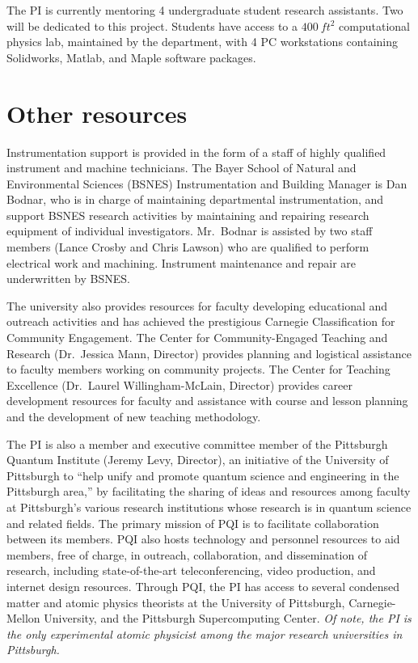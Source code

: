 \documentclass[fontsize=10pt,paper=letter,twoside=false,onecolumn]{scrartcl} %
\begin{document}
The PI is currently mentoring 4 undergraduate student research assistants. Two will be dedicated
to this project.
Students have access to a $\SI{400}{ft^2}$ computational physics lab, maintained by the department, with 4 PC workstations containing Solidworks, Matlab, and Maple software packages.

\section*{Other resources}
Instrumentation support is provided in the form of a staff of highly qualified instrument and machine
technicians. The Bayer School of Natural and Environmental Sciences (BSNES) Instrumentation and
Building Manager is Dan Bodnar, who is in charge of maintaining departmental instrumentation, and
support BSNES research activities by maintaining and repairing research equipment of individual
investigators. Mr.~Bodnar is assisted by two staff members (Lance Crosby and Chris Lawson) who are
qualified to perform electrical work and machining. Instrument maintenance and repair are
underwritten by BSNES.

The university also provides resources for faculty developing educational and outreach activities and has achieved the prestigious Carnegie Classification for Community Engagement.
The Center for Community-Engaged Teaching and Research (Dr.~Jessica Mann,  Director) provides planning and logistical assistance to faculty members working on community projects.
The Center for Teaching Excellence (Dr.~Laurel Willingham-McLain, Director) provides career development resources for faculty and assistance with course and lesson planning and the development of new teaching methodology.

The PI is also a member and executive committee member of the Pittsburgh Quantum Institute (Jeremy Levy, Director), an initiative of the University of Pittsburgh to ``help unify and promote quantum science and engineering in the Pittsburgh area,'' by facilitating the sharing of ideas and resources among faculty at Pittsburgh's various research institutions whose research is in quantum science and related fields.  The primary mission of PQI is to facilitate collaboration between its members.  PQI also hosts technology and personnel resources to aid members, free of charge, in outreach, collaboration, and dissemination of research, including state-of-the-art teleconferencing, video production, and internet design resources.  Through PQI, the PI has access to several condensed matter and atomic physics theorists at the University of Pittsburgh, Carnegie-Mellon University, and the Pittsburgh Supercomputing Center.  \emph{Of note, the PI is the only experimental atomic physicist among the major research universities in Pittsburgh.}
\end{document}
